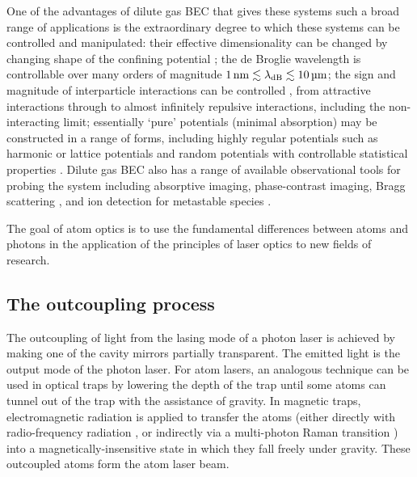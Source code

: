 

One of the advantages of dilute gas BEC that gives these systems such a broad range of applications is the extraordinary degree to which these systems can be controlled and manipulated:  their effective dimensionality can be changed by changing shape of the confining potential \citep{Olshanii:1998,Paredes:2004,Kinoshita:2004}; the de Broglie wavelength is controllable over many orders of magnitude $\unit[1]{nm} \lesssim \lambda_\text{dB} \lesssim \unit[10]{\micro m}$; the sign and magnitude of interparticle interactions can be controlled \citep{Inouye:1998hy}, from attractive interactions through to almost infinitely repulsive interactions, including the non-interacting limit; essentially `pure' potentials (minimal absorption) may be constructed in a range of forms, including highly regular potentials such as harmonic or lattice potentials and random potentials with controllable statistical properties \citep{Damski:2003,Lye:2005,Clement:2005,Fort:2005,Schulte:2005}.  Dilute gas BEC also has a range of available observational tools for probing the system \citep{Ketterle:1999fk} including absorptive imaging, phase-contrast imaging, Bragg scattering \citep{Stenger:1999a}, and ion detection for metastable species \citep{Robert:2001}.

The goal of atom optics is to use the fundamental differences between atoms and photons in the application of the principles of laser optics to new fields of research.

\subsection{The outcoupling process}

The outcoupling of light from the lasing mode of a photon laser is achieved by making one of the cavity mirrors partially transparent.  The emitted light is the output mode of the photon laser.  For atom lasers, an analogous technique can be used in optical traps by lowering the depth of the trap until some atoms can tunnel out of the trap with the assistance of gravity.  In magnetic traps, electromagnetic radiation is applied to transfer the atoms (either directly with radio-frequency radiation \citep{Mewes:1997,Bloch:1999mi}, or indirectly via a multi-photon Raman transition \citep{Moy:1997,Hagley:1999dz,Robins:2006fk}) into a magnetically-insensitive state in which they fall freely under gravity.  These outcoupled atoms form the atom laser beam.

